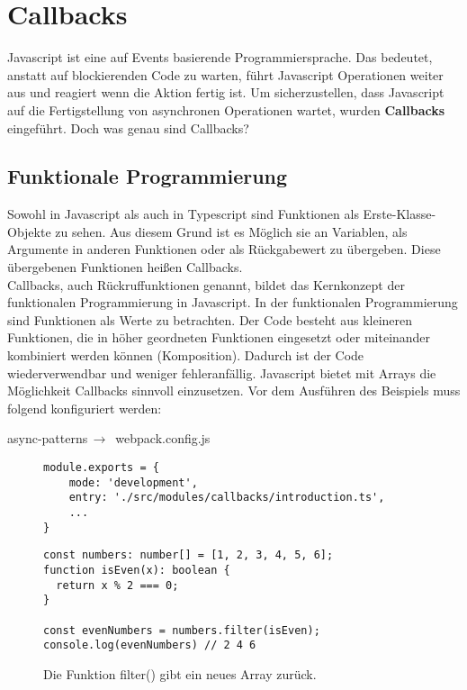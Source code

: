 \section{Callbacks}
Javascript ist eine auf Events basierende Programmiersprache. Das bedeutet, anstatt auf blockierenden Code zu warten, führt Javascript Operationen weiter aus und reagiert wenn die Aktion fertig ist. Um sicherzustellen, dass Javascript auf die Fertigstellung von asynchronen Operationen wartet, wurden \textbf{Callbacks} eingeführt. Doch was genau sind Callbacks?

\subsection{Funktionale Programmierung}

Sowohl in Javascript als auch in Typescript sind Funktionen als Erste-Klasse-Objekte zu sehen. Aus diesem Grund ist es Möglich sie an Variablen, als Argumente in anderen Funktionen oder als Rückgabewert zu übergeben. Diese übergebenen Funktionen heißen Callbacks.\\

\noindent
Callbacks, auch Rückruffunktionen genannt, bildet das Kernkonzept der funktionalen Programmierung in Javascript.\cite{callbacks-intro} In der funktionalen Programmierung sind Funktionen als Werte zu betrachten. Der Code besteht aus kleineren Funktionen, die in höher geordneten Funktionen eingesetzt oder miteinander kombiniert werden können (Komposition). Dadurch ist der Code wiederverwendbar und weniger fehleranfällig. Javascript bietet mit Arrays die Möglichkeit Callbacks sinnvoll einzusetzen. Vor dem Ausführen des Beispiels muss folgend konfiguriert werden:

\begin{center}
    async-patterns$\,\to\,$ webpack.config.js
\end{center}

\begin{figure}[H]
\begin{lstlisting}[basicstyle=\small]
module.exports = {
    mode: 'development',
    entry: './src/modules/callbacks/introduction.ts',
    ...
}
\end{lstlisting}
\end{figure}

\begin{figure}[H]
\begin{lstlisting}[basicstyle=\small]
const numbers: number[] = [1, 2, 3, 4, 5, 6];
function isEven(x): boolean { 
  return x % 2 === 0; 
}

const evenNumbers = numbers.filter(isEven);
console.log(evenNumbers) // 2 4 6
\end{lstlisting}
\caption{Die Funktion filter() gibt ein neues Array zurück.}
\end{figure}

